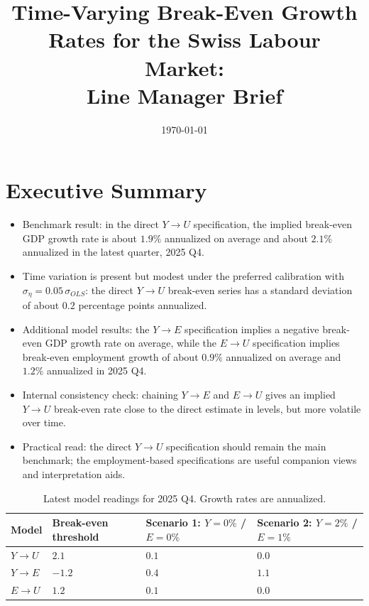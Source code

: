 \documentclass[11pt]{article}
\title{Time-Varying Break-Even Growth Rates for the Swiss Labour Market:\\Line Manager Brief}
\author{}
\date{\today}
\begin{document}
\maketitle

\section{Executive Summary}
\begin{itemize}
    \item Benchmark result: in the direct \(Y \rightarrow U\) specification, the implied break-even GDP growth rate is about \(1.9\%\) annualized on average and about \(2.1\%\) annualized in the latest quarter, 2025 Q4.
    \item Time variation is present but modest under the preferred calibration with \(\sigma_{\eta}=0.05\,\sigma_{OLS}\): the direct \(Y \rightarrow U\) break-even series has a standard deviation of about \(0.2\) percentage points annualized.
    \item Additional model results:
    the \(Y \rightarrow E\) specification implies a negative break-even GDP growth rate on average,
    while the \(E \rightarrow U\) specification implies break-even employment growth of about \(0.9\%\) annualized on average and \(1.2\%\) annualized in 2025 Q4.
    \item Internal consistency check: chaining \(Y \rightarrow E\) and \(E \rightarrow U\) gives an implied \(Y \rightarrow U\) break-even rate close to the direct estimate in levels, but more volatile over time.
    \item Practical read: the direct \(Y \rightarrow U\) specification should remain the main benchmark; the employment-based specifications are useful companion views and interpretation aids.
\end{itemize}

\begin{table}[H]
\centering
\small
\begin{tabular}{>{\raggedright\arraybackslash}p{3.2cm} >{\raggedleft\arraybackslash}p{2.6cm} >{\raggedleft\arraybackslash}p{2.9cm} >{\raggedleft\arraybackslash}p{2.8cm}}
\toprule
Model & Break-even threshold & Scenario 1: \(Y=0\%\) / \(E=0\%\) & Scenario 2: \(Y=2\%\) / \(E=1\%\) \\
\midrule
\(Y \rightarrow U\) & \(2.1\) & \(0.1\) & \(0.0\) \\
\(Y \rightarrow E\) & \(-1.2\) & \(0.4\) & \(1.1\) \\
\(E \rightarrow U\) & \(1.2\) & \(0.1\) & \(0.0\) \\
\bottomrule
\end{tabular}
\caption{Latest model readings for 2025 Q4. Growth rates are annualized.}
\end{table}
\end{document}

